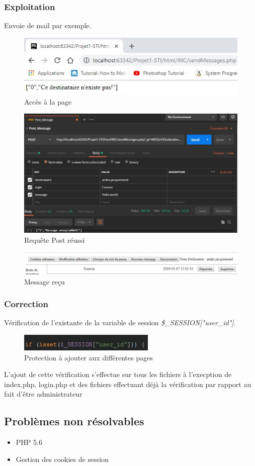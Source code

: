 \documentclass[12pt]{article}
\begin{document}
\subsubsection{Exploitation}
Envoie de mail par exemple.
\begin{figure}[H]
\centering
\includegraphics{images/withoutLogin.jpg}
\caption{Accès à la page}
\end{figure}
\begin{figure}[H]
\centering
\includegraphics[width=\linewidth]{images/postmanSendMessage.jpg}
\caption{Requête Post réussi}
\end{figure}
\begin{figure}[H]
\centering
\includegraphics[width=\linewidth]{images/postmanSendMessageSuccess.jpg}
\caption{Message reçu}
\end{figure}

\subsubsection{Correction}
Vérification de l'existante de la variable de session \textit{\$\_SESSION["user\_id"]}.
\begin{figure}[H]
\centering
\includegraphics[width=\linewidth]{images/protectionPage.jpg}
\caption{Protection à ajouter aux différentes pages}
\end{figure}
L'ajout de cette vérification s'effectue sur tous les fichiers à l'execption de index.php, login.php et des fichiers effectuant déjà la vérification par rapport au fait d'être administrateur


\subsection{Problèmes non résolvables}
\begin{itemize}
\item PHP 5.6
\item Gestion des cookies de session
\end{itemize}
\end{document}
